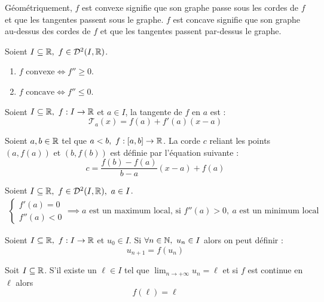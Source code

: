 \par Géométriquement, $f$ est convexe signifie que son graphe passe sous les cordes de $f$ et que les tangentes passent sous le graphe. $f$ est concave signifie que son graphe au-dessus des cordes de $f$ et que les tangentes passent par-dessus le graphe.

\begin{theorem}
	Soient $I \subseteq \mathbb{R},\ f \in \mathcal{D}^2(I, \mathbb{R})$.
        \begin{enumerate}
                \item $f \text{ convexe} \iff f'' \geq 0$.
                \item $f \text{ concave} \iff f'' \leq 0$.
            \end{enumerate}
\end{theorem}

\begin{proposition}
	Soient $I \subseteq \mathbb{R},\ f : I \to \mathbb{R}$ et $a \in I$, la tangente de $f$ en $a$ est :
	\[ \mathcal{T}_a(x) = f(a) + f'(a)(x - a) \]
\end{proposition}

\begin{proposition}
	Soient $a, b \in \mathbb{R}$ tel que $a < b,\ f : [a, b] \to \mathbb{R}$.
	La corde $c$ reliant les points $(a, f(a))$ et $(b, f(b))$ est définie par l'équation suivante :
	\[ c = \frac{f(b) - f(a)}{b - a} (x - a) + f(a) \]
\end{proposition}

\begin{proposition}
	Soient $I \subseteq \mathbb{R},\ f \in \mathcal{D}^2(I, \mathbb{R}),\ a \in I$.
	\begin{align*}
		\begin{cases}
			f'(a) = 0 \\
			f''(a) < 0
		\end{cases}
		\implies a \text{ est un maximum local, si } f''(a) > 0,\ a \text{  est un minimum local}
	\end{align*}
\end{proposition}

\begin{definition}
	Soient $I \subseteq \mathbb{R},\ f : I \to \mathbb{R}$ et $u_0 \in I$.
	Si $\forall n \in \mathbb{N},\ u_n \in I$ alors on peut définir :
	\[ u_{n + 1} = f(u_n) \]
\end{definition}

\begin{lemma}
	Soit $I \subseteq \mathbb{R}$. S'il existe un $\ell \in I$ tel que $\lim_{n \to +\infty} u_n = \ell$ et si $f$ est continue en $\ell$ alors 
	\[ f(\ell) = \ell \]
\end{lemma}

